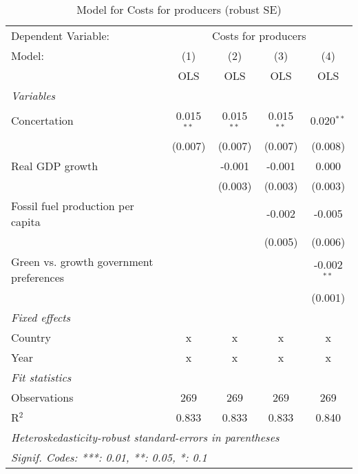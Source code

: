 
\begin{table}[htbp]
   \caption{Model for Costs for producers (robust SE)}
   \centering
   \begin{tabular}{lcccc}
      \toprule
      Dependent Variable: & \multicolumn{4}{c}{Costs for producers}\\
      Model:                                  & (1)          & (2)          & (3)          & (4)\\  
                                              &  OLS         & OLS          & OLS          & OLS\\  
      \midrule
      \emph{Variables}\\
      Concertation                            & 0.015$^{**}$ & 0.015$^{**}$ & 0.015$^{**}$ & 0.020$^{**}$\\   
                                              & (0.007)      & (0.007)      & (0.007)      & (0.008)\\   
      Real GDP growth                         &              & -0.001       & -0.001       & 0.000\\   
                                              &              & (0.003)      & (0.003)      & (0.003)\\   
      Fossil fuel production per capita       &              &              & -0.002       & -0.005\\   
                                              &              &              & (0.005)      & (0.006)\\   
      Green vs. growth government preferences &              &              &              & -0.002$^{**}$\\   
                                              &              &              &              & (0.001)\\   
      \emph{Fixed effects}\\
      Country                                 & x            & x            & x            & x\\  
      Year                                    & x            & x            & x            & x\\  
      \midrule \emph{Fit statistics}\\
      Observations                            & 269          & 269          & 269          & 269\\  
      R$^2$                                   & 0.833        & 0.833        & 0.833        & 0.840\\  
      \midrule
      \multicolumn{5}{l}{\emph{Heteroskedasticity-robust standard-errors in parentheses}}\\
      \multicolumn{5}{l}{\emph{Signif. Codes: ***: 0.01, **: 0.05, *: 0.1}}\\
   \end{tabular}
\end{table}



